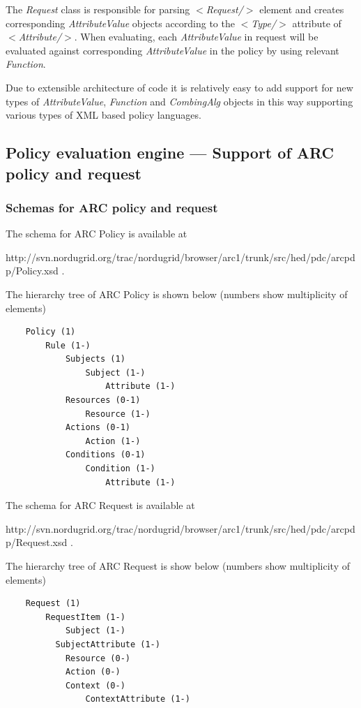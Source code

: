 \documentclass{article}                            %
\begin{document}
The \textit{Request} class is responsible for parsing \textit{$<$Request/$>$} element and creates corresponding \textit{AttributeValue} objects according to the \textit{$<$Type/$>$} attribute of \textit{$<$Attribute/$>$}. When evaluating, each \textit{AttributeValue} in request will be evaluated against corresponding \textit{AttributeValue} in the policy by using relevant \textit{Function}.

Due to extensible architecture of code it is relatively easy to add support for new types of \textit{AttributeValue}, \textit{Function} and \textit{CombingAlg} objects in this way supporting various types of XML based policy languages.

\subsection{Policy evaluation engine --- Support of ARC policy and request} %
\label{subsec:policy_engine_arc}


\subsubsection{Schemas for ARC policy and request} %
\label{subsubsec:arc_policy_schema}
The schema for ARC Policy is available at

http://svn.nordugrid.org/trac/nordugrid/browser/arc1/trunk/src/hed/pdc/arcpdp/Policy.xsd .

The hierarchy tree of ARC Policy is shown below (numbers show multiplicity of elements)

\begin{verbatim}
    Policy (1)
        Rule (1-)
            Subjects (1)
                Subject (1-)
                    Attribute (1-)
            Resources (0-1)
                Resource (1-)
            Actions (0-1)
                Action (1-)
            Conditions (0-1)
                Condition (1-)
                    Attribute (1-)
\end{verbatim}

The schema for ARC Request is available at

http://svn.nordugrid.org/trac/nordugrid/browser/arc1/trunk/src/hed/pdc/arcpdp/Request.xsd .

The hierarchy tree of ARC Request is show below (numbers show multiplicity of elements)

\begin{verbatim}
    Request (1)
        RequestItem (1-)
            Subject (1-)
          SubjectAttribute (1-)
            Resource (0-)
            Action (0-)
            Context (0-)
                ContextAttribute (1-)
\end{verbatim}
\end{document}
